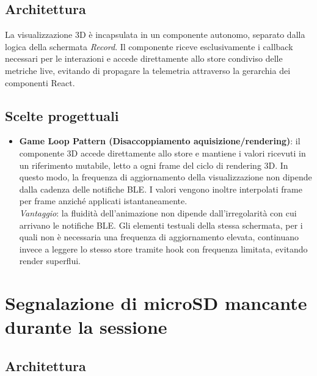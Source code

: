 \subsection{Architettura}

La visualizzazione 3D è incapsulata in un componente autonomo, separato dalla logica della schermata \textit{Record}. Il componente riceve esclusivamente i 
callback necessari per le interazioni e accede direttamente allo store condiviso delle metriche live, evitando di propagare la telemetria attraverso la 
gerarchia dei componenti React.

\subsection{Scelte progettuali}

\begin{itemize}
    \item \textbf{Game Loop Pattern (Disaccoppiamento aquisizione/rendering)}: il componente 3D accede direttamente allo store e mantiene i 
    valori ricevuti in un riferimento mutabile, letto a ogni frame del ciclo di rendering 3D. In questo modo, la frequenza di aggiornamento della visualizzazione 
    non dipende dalla cadenza delle notifiche BLE. I valori vengono inoltre interpolati frame per frame anziché applicati istantaneamente.\\
    \textit{Vantaggio}: la fluidità dell'animazione non dipende dall'irregolarità con cui arrivano le notifiche BLE. Gli elementi testuali della stessa schermata, 
    per i quali non è necessaria una frequenza di aggiornamento elevata, continuano invece a leggere lo stesso store tramite \gls{hook} con frequenza limitata, evitando
     render superflui.
\end{itemize}

\newpage

\section{Segnalazione di microSD mancante durante la sessione} \label{sec:app-sdmissing}

\subsection{Architettura}

